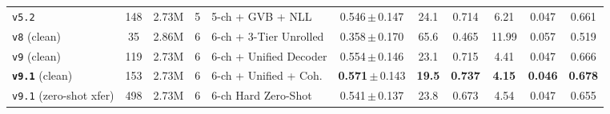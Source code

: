 \begin{table}[t]
{\begin{tabular}{lccllcccccc}
\texttt{v5.2} & 148 & 2.73M & 5 & 5-ch + GVB + NLL & 0.546\,$\pm$\,0.147 & 24.1 & 0.714 & 6.21 & 0.047 & 0.661 \\
\texttt{v8} (clean) & 35 & 2.86M & 6 & 6-ch + 3-Tier Unrolled & 0.358\,$\pm$\,0.170 & 65.6 & 0.465 & 11.99 & 0.057 & 0.519 \\
\texttt{v9} (clean) & 119 & 2.73M & 6 & 6-ch + Unified Decoder & 0.554\,$\pm$\,0.146 & 23.1 & 0.715 & 4.41 & 0.047 & 0.666 \\
\textbf{\texttt{v9.1}} (clean) & 153 & 2.73M & 6 & 6-ch + Unified + Coh. & \textbf{0.571}\,$\pm$\,0.143 & \textbf{19.5} & \textbf{0.737} & \textbf{4.15} & \textbf{0.046} & \textbf{0.678} \\
\texttt{v9.1} (zero-shot xfer) & 498 & 2.73M & 6 & 6-ch Hard Zero-Shot & 0.541\,$\pm$\,0.137 & 23.8 & 0.673 & 4.54 & 0.047 & 0.655 \\
\bottomrule
\end{tabular}%
}
\end{table}
